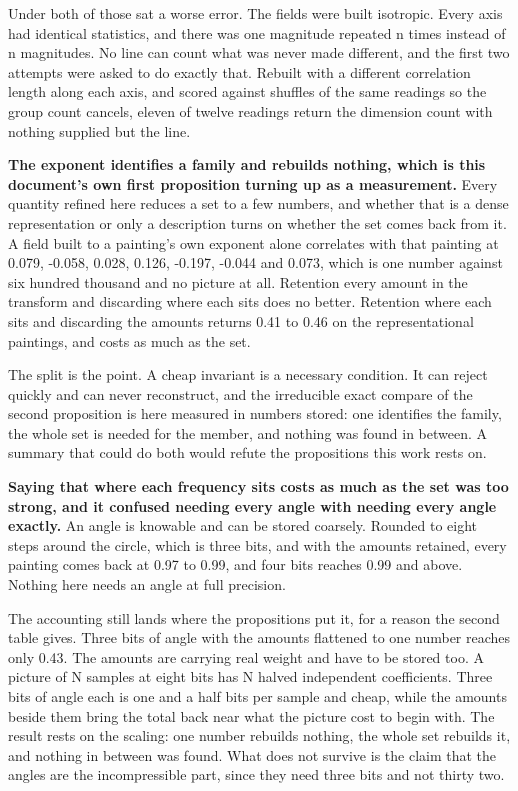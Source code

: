 Under both of those sat a worse error. The fields were built isotropic. Every axis had identical statistics, and there was one magnitude repeated n times instead of n magnitudes. No line can count what was never made different, and the first two attempts were asked to do exactly that. Rebuilt with a different correlation length along each axis, and scored against shuffles of the same readings so the group count cancels, eleven of twelve readings return the dimension count with nothing supplied but the line.

\textbf{The exponent identifies a family and rebuilds nothing, which is this document's own first proposition turning up as a measurement.} Every quantity refined here reduces a set to a few numbers, and whether that is a dense representation or only a description turns on whether the set comes back from it. A field built to a painting's own exponent alone correlates with that painting at 0.079, -0.058, 0.028, 0.126, -0.197, -0.044 and 0.073, which is one number against six hundred thousand and no picture at all. Retention every amount in the transform and discarding where each sits does no better. Retention where each sits and discarding the amounts returns 0.41 to 0.46 on the representational paintings, and costs as much as the set.

The split is the point. A cheap invariant is a necessary condition. It can reject quickly and can never reconstruct, and the irreducible exact compare of the second proposition is here measured in numbers stored: one identifies the family, the whole set is needed for the member, and nothing was found in between. A summary that could do both would refute the propositions this work rests on.

\textbf{Saying that where each frequency sits costs as much as the set was too strong, and it confused needing every angle with needing every angle exactly.} An angle is knowable and can be stored coarsely. Rounded to eight steps around the circle, which is three bits, and with the amounts retained, every painting comes back at 0.97 to 0.99, and four bits reaches 0.99 and above. Nothing here needs an angle at full precision.

The accounting still lands where the propositions put it, for a reason the second table gives. Three bits of angle with the amounts flattened to one number reaches only 0.43. The amounts are carrying real weight and have to be stored too. A picture of N samples at eight bits has N halved independent coefficients. Three bits of angle each is one and a half bits per sample and cheap, while the amounts beside them bring the total back near what the picture cost to begin with. The result rests on the scaling: one number rebuilds nothing, the whole set rebuilds it, and nothing in between was found. What does not survive is the claim that the angles are the incompressible part, since they need three bits and not thirty two.

